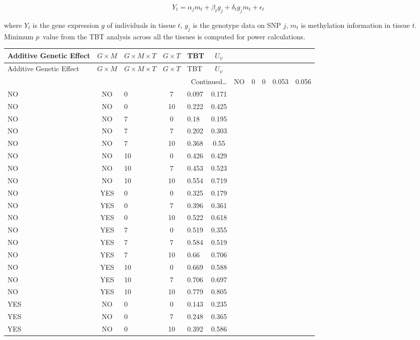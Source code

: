 \documentclass[hidelinks]{article}
\begin{document}
\begingroup
\large
\begin{equation}
Y_{t} =  \alpha_j m_{t} + \beta_t g_j + \delta_t g_j m_{t} + \epsilon_t
\end{equation}
\endgroup

where $Y_t$ is the gene expression $g$ of individuals in tissue $t$, $g_j$ is the genotype data on SNP $j$, $m_t$ is methylation information in tissue $t$. Minimum $p$~value from the TBT analysis across all the tissues is computed for power calculations.

\begin{longtable}{lclclclclcl}
\hline
Additive Genetic Effect & $G \times M$ & $G \times M \times T$ & $G \times T$ & TBT & $U_\psi$ \\ \hline
\endfirsthead
Additive Genetic Effect & $G \times M$ & $G \times M \times T$ & $G \times T$ & TBT & $U_\psi$ \\ \hline
\endhead
\multicolumn{6}{r}{{Continued\ldots}} \
\endfoot
\hline
\endlastfoot
NO & NO & 0 & 0 & 0.053 & 0.056 \\
NO & NO & 0 & 7 & 0.097 & 0.171 \\
NO & NO & 0 & 10 & 0.222 & 0.425 \\
NO & NO & 7 & 0 & 0.18 & 0.195 \\
NO & NO & 7 & 7 & 0.202 & 0.303 \\
NO & NO & 7 & 10 & 0.368 & 0.55 \\
NO & NO & 10 & 0 & 0.426 & 0.429 \\
NO & NO & 10 & 7 & 0.453 & 0.523 \\
NO & NO & 10 & 10 & 0.554 & 0.719 \\ \hdashline
NO & YES & 0 & 0 & 0.325 & 0.179 \\
NO & YES & 0 & 7 & 0.396 & 0.361 \\
NO & YES & 0 & 10 & 0.522 & 0.618 \\
NO & YES & 7 & 0 & 0.519 & 0.355 \\
NO & YES & 7 & 7 & 0.584 & 0.519 \\
NO & YES & 7 & 10 & 0.66 & 0.706 \\
NO & YES & 10 & 0 & 0.669 & 0.588 \\
NO & YES & 10 & 7 & 0.706 & 0.697 \\
NO & YES & 10 & 10 & 0.779 & 0.805 \\ \hline
YES & NO & 0 & 0 & 0.143 & 0.235 \\
YES & NO & 0 & 7 & 0.248 & 0.365 \\
YES & NO & 0 & 10 & 0.392 & 0.586 \\

\end{longtable}
\end{document}
